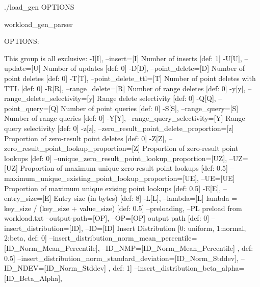 ./load_gen {OPTIONS}

    workload_gen_parser

  OPTIONS:

      This group is all exclusive:
        -I[I], --insert=[I]               Number of inserts [def: 1]
        -U[U], --update=[U]               Number of updates [def: 0]
        -D[D], --point_delete=[D]         Number of point deletes [def: 0]
        -T[T], --point_delete_ttl=[T]     Number of point deletes with TTL [def: 0]
        -R[R], --range_delete=[R]         Number of range deletes [def: 0]
        -y[y],
        --range_delete_selectivity=[y]    Range delete selectivity [def: 0]
        -Q[Q], --point_query=[Q]          Number of point queries [def: 0]
        -S[S], --range_query=[S]          Number of range queries [def: 0]
        -Y[Y],
        --range_query_selectivity=[Y]     Range query selectivity [def: 0]
        -z[z],
        --zero_result_point_delete_proportion=[z]
                                          Proportion of zero-result point
                                          deletes [def: 0]
        -Z[Z],
        --zero_result_point_lookup_proportion=[Z]
                                          Proportion of zero-result point
                                          lookups [def: 0]
        --unique_zero_result_point_lookup_proportion=[UZ],
        --UZ=[UZ]                         Proportion of maximum unique
                                          zero-result point lookups [def: 0.5]
        --maximum_unique_existing_point_lookup_proportion=[UE],
        --UE=[UE]                         Proportion of maximum unique exising
                                          point lookups [def: 0.5]
        -E[E], --entry_size=[E]           Entry size (in bytes) [def: 8]
        -L[L], --lambda=[L]               lambda = key_size / (key_size +
                                          value_size) [def: 0.5]
        --preloading, --PL                preload from workload.txt
        --output-path=[OP], --OP=[OP]     output path [def: 0]
        --insert_distribution=[ID],
        --ID=[ID]                         Insert Distribution [0: uniform,
                                          1:normal, 2:beta, def: 0]
        --insert_distribution_norm_mean_percentile=[ID_Norm_Mean_Percentile],
        --ID_NMP=[ID_Norm_Mean_Percentile]
                                          , def: 0.5]
        --insert_distribution_norm_standard_deviation=[ID_Norm_Stddev],
        --ID_NDEV=[ID_Norm_Stddev]        , def: 1]
        --insert_distribution_beta_alpha=[ID_Beta_Alpha],
